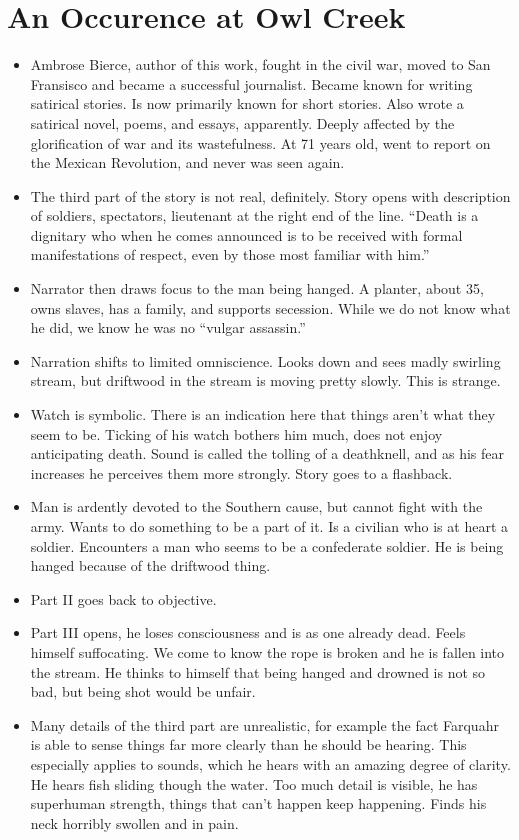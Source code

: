 \documentclass[10pt]{article}
\begin{document}
\section{An Occurence at Owl Creek}
\begin{itemize}
	\item Ambrose Bierce, author of this work, fought in the civil war, 
		moved to San Fransisco and became a successful journalist.  
		Became known for writing satirical stories.  Is now primarily 
		known for short stories.  Also wrote a satirical novel, poems, 
		and essays, apparently.  Deeply affected by the glorification 
		of war and its wastefulness.  At 71 years old, went to report 
		on the Mexican Revolution, and never was seen again.
	\item The third part of the story is not real, definitely.  Story 
		opens with description of soldiers, spectators, lieutenant at 
		the right end of the line.  ``Death is a dignitary who when he 
		comes announced is to be received with formal manifestations 
		of respect, even by those most familiar with him.''
	\item Narrator then draws focus to the man being hanged.  A planter, 
		about 35, owns slaves, has a family, and supports secession.  
		While we do not know what he did, we know he was no ``vulgar assassin.''
	\item Narration shifts to limited omniscience.  Looks down and sees 
		madly swirling stream, but driftwood in the stream is moving 
		pretty slowly.  This is strange.
	\item Watch is symbolic.  There is an indication here that things 
		aren't what they seem to be.  Ticking of his watch bothers him 
		much, does not enjoy anticipating death.  Sound is called the 
		tolling of a deathknell, and as his fear increases he 
		perceives them more strongly.  Story goes to a flashback.
	\item Man is ardently devoted to the Southern cause, but cannot fight 
		with the army.  Wants to do something to be a part of it.  Is 
		a civilian who is at heart a soldier.  Encounters a man who 
		seems to be a confederate soldier.  He is being hanged because 
		of the driftwood thing.
	\item Part II goes back to objective.
	\item Part III opens, he loses consciousness and is as one already 
		dead.  Feels himself suffocating.  We come to know the rope is 
		broken and he is fallen into the stream.  He thinks to himself 
		that being hanged and drowned is not so bad, but being shot 
		would be unfair.  
	\item Many details of the third part are unrealistic, for example the 
		fact Farquahr is able to sense things far more clearly than he 
		should be hearing.  This especially applies to sounds, which 
		he hears with an amazing degree of clarity.  He hears fish 
		sliding though the water.  Too much detail is visible, he has 
		superhuman strength, things that can't happen keep happening.  
		Finds his neck horribly swollen and in pain.
\end{itemize}
\end{document}
